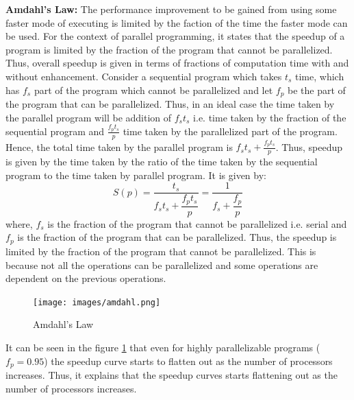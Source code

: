 \documentclass[12pt]{book}
\begin{document}
\begin{itemize}
    \textbf{Amdahl's Law: }The performance improvement to be gained from using some faster mode of executing is limited by the faction of the time the faster mode can be used. For the context of parallel programming,
    it states that the speedup of a program is limited by the fraction of the program that cannot be parallelized. Thus, overall speedup is given in terms of fractions of computation time with and without enhancement. Consider a sequential program which takes $t_s$ time, which has $f_s$ part of the program which cannot be parallelized and let 
    $f_p$ be the part of the program that can be parallelized. Thus, in an ideal case the time taken by the parallel program will be addition of $f_st_s$ i.e. time taken by the fraction of the sequential program and $\frac{f_pt_s}{p}$ time taken by the parallelized part of the program. Hence, the total time taken by the parallel program is $f_st_s + \frac{f_pt_s}{p}$.
    Thus, speedup is given by the time taken by the ratio of the time taken by the sequential program to the time taken by parallel program. It is given by:
    \[ S(p)=\dfrac{t_s}{f_st_s+\dfrac{f_pt_s}{p}}=\dfrac{1}{f_s+\dfrac{f_p}{p}}\]
    where, $f_s$ is the fraction of the program that cannot be parallelized i.e. serial and $f_p$ is the fraction of the program that can be parallelized. Thus, the speedup is limited by the fraction of the program that cannot be parallelized.
    This is because not all the operations can be parallelized and some operations are dependent on the previous operations.
    \begin{figure}[H]
        \centering
        \texttt{[image: images/amdahl.png]}
        \caption{Amdahl's Law}
        \label{fig:amdahl}
    \end{figure}
    It can be seen in the figure \ref{fig:amdahl} that even for highly parallelizable programs ($f_p=0.95$) the speedup curve starts to flatten out as the number of processors increases.
    Thus, it explains that the speedup curves starts flattening out as the number of processors increases. 


\end{itemize}
\end{document}

